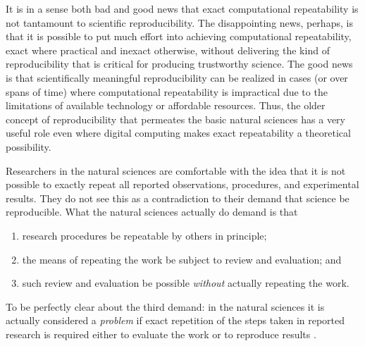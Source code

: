 It is in a sense both bad and good news that exact computational repeatability is not tantamount to scientific reproducibility.
The disappointing news, perhaps, is that it is possible to put much effort into achieving computational repeatability,
	exact where practical and inexact otherwise,
	without delivering the kind of reproducibility that is critical for producing trustworthy science.
The good news is that scientifically meaningful reproducibility can be realized in cases (or over spans of time)
	where computational repeatability is impractical due to the limitations of available technology or affordable resources.
Thus, the older concept of reproducibility that permeates the basic natural sciences has a very
	useful role even where digital computing makes exact repeatability a theoretical possibility.

 Researchers in the natural sciences are comfortable with the idea that it is not possible to exactly
	repeat all reported observations, procedures, and experimental results.
They do not see this as a contradiction to their demand that science be reproducible.
What the natural sciences actually do demand is that
\begin{enumerate}
\item research procedures be repeatable by others in principle;
\item the means of repeating the work be subject to review and
  evaluation; and
\item such review and evaluation be possible \emph{without}
  actually repeating the work.
\end{enumerate}
To be perfectly clear about the third demand: in the natural sciences
it is actually considered a \emph{problem} if exact repetition of the
steps taken in reported research is required either to evaluate the
work or to reproduce results \cite{milkowski2018replicability}.


